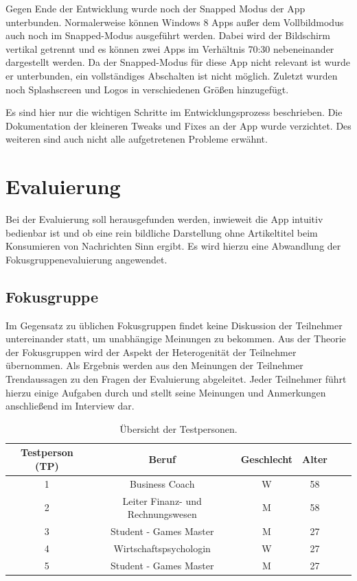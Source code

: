 \documentclass[12pt,a4paper,bibtotoc,abstracton]{scrartcl}
\begin{document}
Gegen Ende der Entwicklung wurde noch der Snapped Modus der App unterbunden. Normalerweise können Windows 8 Apps außer dem Vollbildmodus auch noch im Snapped-Modus ausgeführt werden. Dabei wird der Bildschirm vertikal getrennt und es können zwei Apps im Verhältnis 70:30 nebeneinander dargestellt werden. Da der Snapped-Modus für diese App nicht relevant ist wurde er unterbunden, ein vollständiges Abschalten ist nicht möglich. Zuletzt wurden noch Splashscreen und Logos in verschiedenen Größen hinzugefügt.

Es sind hier nur die wichtigen Schritte im Entwicklungsprozess beschrieben. Die Dokumentation der kleineren Tweaks und Fixes an der App wurde verzichtet. Des weiteren sind auch nicht alle aufgetretenen Probleme erwähnt. 

\newpage
\section{Evaluierung} 
\label{sec:evaluierung}
Bei der Evaluierung soll herausgefunden werden, inwieweit die App intuitiv bedienbar ist und ob eine rein bildliche Darstellung ohne Artikeltitel beim Konsumieren von Nachrichten Sinn ergibt. Es wird hierzu eine Abwandlung der Fokusgruppenevaluierung angewendet. 

\subsection{Fokusgruppe}
\label{subsec:fokusgruppe}
Im Gegensatz zu üblichen Fokusgruppen findet keine Diskussion der Teilnehmer untereinander statt, um unabhängige Meinungen zu bekommen. Aus der Theorie der Fokusgruppen wird der Aspekt der Heterogenität der Teilnehmer übernommen. Als Ergebnis werden aus den Meinungen der Teilnehmer Trendaussagen zu den Fragen der Evaluierung abgeleitet. Jeder Teilnehmer führt hierzu einige Aufgaben durch und stellt seine Meinungen und Anmerkungen anschließend im Interview dar.

\begin{table}[h]
\centering
\begin{tabular}{|c|c|c|c|c|c|}
\hline 
\rule[-1ex]{0pt}{3.5ex} \textbf{Testperson (TP)} & \textbf{Beruf} & \textbf{Geschlecht} & \textbf{Alter} \\ 
\hline 
\rule[-1ex]{0pt}{2.5ex} 1 & Business Coach & W & 58 \\ 
\hline 
\rule[-1ex]{0pt}{2.5ex} 2 & Leiter Finanz- und Rechnungswesen & M & 58 \\ 
\hline 
\rule[-1ex]{0pt}{2.5ex} 3 & Student - Games Master & M & 27  \\ 
\hline 
\rule[-1ex]{0pt}{2.5ex} 4 & Wirtschaftspsychologin & W & 27 \\ 
\hline 
\rule[-1ex]{0pt}{2.5ex} 5 & Student - Games Master & M & 27 \\ 
\hline 
\end{tabular} 
\caption{Übersicht der Testpersonen.}
\label{tab:testpersonen}
\end{table}
\end{document}
